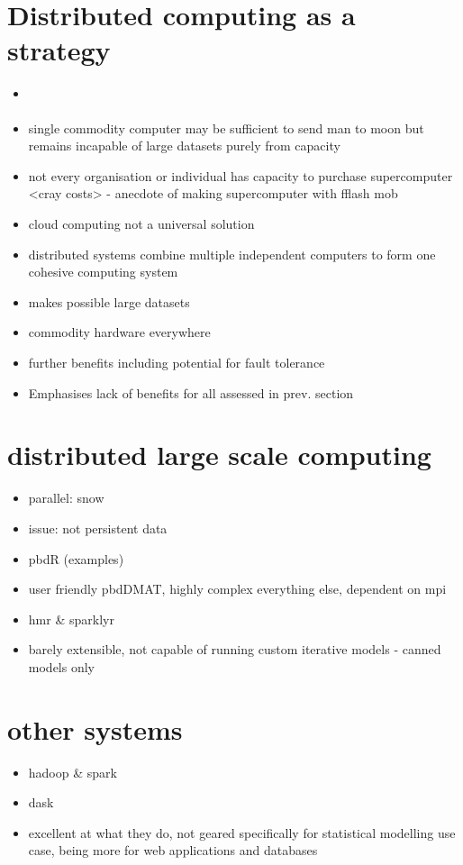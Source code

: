 \documentclass[a4paper,10pt]{article}
\begin{document}
\section{Distributed computing as a strategy}
\label{dist}
\begin{itemize}
	\item \cite{boja2012distributed}
	\item single commodity computer may be sufficient to send man to moon but remains incapable of large datasets purely from capacity
	\item not every organisation or individual has capacity to purchase supercomputer <cray costs> - anecdote of making supercomputer with fflash mob
	\item cloud computing not a universal solution
	\item distributed systems combine multiple independent computers to form one cohesive computing system
	\item makes possible large datasets
	\item commodity hardware everywhere
	\item further benefits including potential for fault tolerance
	\item Emphasises lack of benefits for all assessed in prev. section
\end{itemize}

\section{distributed large scale computing}

\begin{itemize}
	\item parallel: snow
	\item issue: not persistent data
	\item pbdR (examples)
	\item user friendly pbdDMAT, highly complex everything else, dependent on mpi
	\item hmr \& sparklyr
	\item barely extensible, not capable of running custom iterative models - canned models only
\end{itemize}

\section{other systems}

\begin{itemize}
	\item hadoop \& spark
	\item dask
	\item excellent at what they do, not geared specifically for statistical modelling use case, being more for web applications and databases
\end{itemize}
\end{document}
